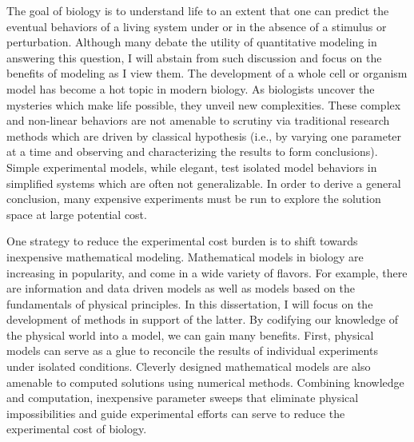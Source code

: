 
\par The goal of biology is to understand life to an extent that one can predict the eventual behaviors of a living system under or in the absence of a stimulus or perturbation.
Although many debate the utility of quantitative modeling in answering this question, I will abstain from such discussion and focus on the benefits of modeling as I view them.
The development of a whole cell or organism model has become a hot topic in modern biology\cite{Roberts2014}.
As biologists uncover the mysteries which make life possible, they unveil new complexities\cite{CheckHayden2010}.
These complex and non-linear behaviors are not amenable to scrutiny via traditional research methods which are driven by classical hypothesis (i.e., by varying one parameter at a time and observing and characterizing the results to form conclusions).
Simple experimental models, while elegant, test isolated model behaviors in simplified systems which are often not generalizable.
In order to derive a general conclusion, many expensive experiments must be run to explore the solution space at large potential cost.

\par One strategy to reduce the experimental cost burden is to shift towards inexpensive mathematical modeling.
Mathematical models in biology are increasing in popularity, and come in a wide variety of flavors\cite{Gunawardena2014}.
For example, there are information and data driven models as well as models based on the fundamentals of physical principles.
In this dissertation, I will focus on the development of methods in support of the latter.
By codifying our knowledge of the physical world into a model, we can gain many benefits.
First, physical models can serve as a glue to reconcile the results of individual experiments under isolated conditions.
Cleverly designed mathematical models are also amenable to computed solutions using numerical methods.
Combining knowledge and computation, inexpensive parameter sweeps that eliminate physical impossibilities and guide experimental efforts can serve to reduce the experimental cost of biology.

